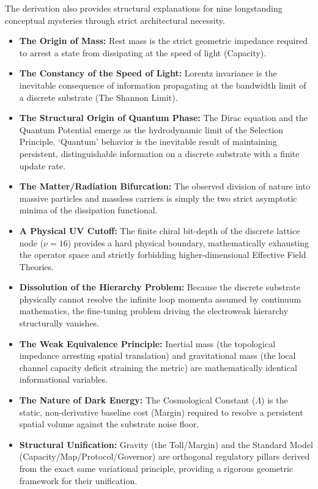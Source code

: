 The derivation also provides structural explanations for nine longstanding conceptual mysteries through strict architectural necessity.
\begin{itemize}
    \item \textbf{The Origin of Mass:} Rest mass is the strict geometric impedance required to arrest a state from dissipating at the speed of light (Capacity).
    \item \textbf{The Constancy of the Speed of Light:} Lorentz invariance is the inevitable consequence of information propagating at the bandwidth limit of a discrete substrate (The Shannon Limit).
    \item \textbf{The Structural Origin of Quantum Phase:} The Dirac equation and the Quantum Potential emerge as the hydrodynamic limit of the Selection Principle. `Quantum' behavior is the inevitable result of maintaining persistent, distinguishable information on a discrete substrate with a finite update rate.
    \item \textbf{The Matter/Radiation Bifurcation:} The observed division of nature into massive particles and massless carriers is simply the two strict asymptotic minima of the dissipation functional.
    \item \textbf{A Physical UV Cutoff:} The finite chiral bit-depth of the discrete lattice node ($\nu=16$) provides a hard physical boundary, mathematically exhausting the operator space and strictly forbidding higher-dimensional Effective Field Theories.
    \item \textbf{Dissolution of the Hierarchy Problem:} Because the discrete substrate physically cannot resolve the infinite loop momenta assumed by continuum mathematics, the fine-tuning problem driving the electroweak hierarchy structurally vanishes.  
    \item \textbf{The Weak Equivalence Principle:} Inertial mass (the topological impedance arresting spatial translation) and gravitational mass (the local channel capacity deficit straining the metric) are mathematically identical informational variables.
    \item \textbf{The Nature of Dark Energy:} The Cosmological Constant ($\Lambda$) is the static, non-derivative baseline cost (Margin) required to resolve a persistent spatial volume against the substrate noise floor.
    \item \textbf{Structural Unification:} Gravity (the Toll/Margin) and the Standard Model (Capacity/Map/Protocol/Governor) are orthogonal regulatory pillars derived from the exact same variational principle, providing a rigorous geometric framework for their unification.
\end{itemize}

